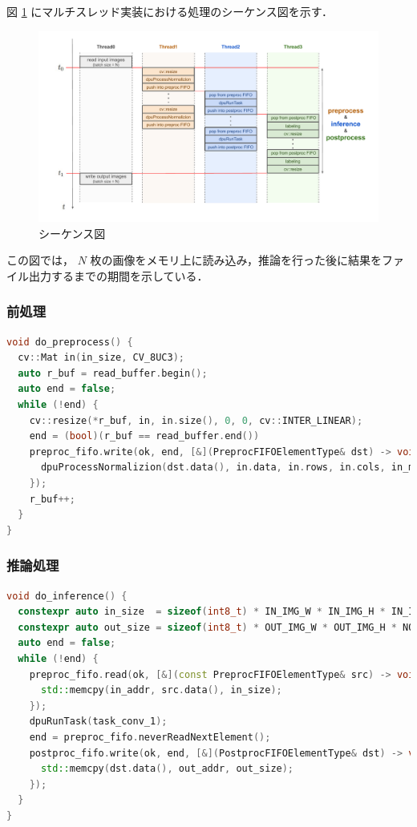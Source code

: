 図 \ref{fig:sequence} にマルチスレッド実装における処理のシーケンス図を示す．

\begin{figure}[h]
  \begin{center}
    \includegraphics[width=\linewidth]{figures/sw_opt_sequence.pdf}
    \caption{シーケンス図}
    \label{fig:sequence}
  \end{center}
\end{figure}

この図では， $N$ 枚の画像をメモリ上に読み込み，推論を行った後に結果をファイル出力するまでの期間を示している．

\subsubsection{前処理}

\setcounter{lstnumber}{1}
\begin{lstlisting}[language=c++,firstnumber=last,caption=do\_preprocess(),label=code:preproc,float,floatplacement=H]
void do_preprocess() {
  cv::Mat in(in_size, CV_8UC3);
  auto r_buf = read_buffer.begin();
  auto end = false;
  while (!end) {
    cv::resize(*r_buf, in, in.size(), 0, 0, cv::INTER_LINEAR);
    end = (bool)(r_buf == read_buffer.end())
    preproc_fifo.write(ok, end, [&](PreprocFIFOElementType& dst) -> void {
      dpuProcessNormalizion(dst.data(), in.data, in.rows, in.cols, in_mean, in_scale_fix, in.step1());
    });
    r_buf++;
  }
}
\end{lstlisting}

\subsubsection{推論処理}

\setcounter{lstnumber}{1}
\begin{lstlisting}[language=c++,firstnumber=last,caption=do\_inference(),label=code:inference,float,floatplacement=H]
void do_inference() {
  constexpr auto in_size  = sizeof(int8_t) * IN_IMG_W * IN_IMG_H * IN_IMG_C;
  constexpr auto out_size = sizeof(int8_t) * OUT_IMG_W * OUT_IMG_H * NOF_CLASS;
  auto end = false;
  while (!end) {
    preproc_fifo.read(ok, [&](const PreprocFIFOElementType& src) -> void {
      std::memcpy(in_addr, src.data(), in_size);
    });
    dpuRunTask(task_conv_1);
    end = preproc_fifo.neverReadNextElement();
    postproc_fifo.write(ok, end, [&](PostprocFIFOElementType& dst) -> void {
      std::memcpy(dst.data(), out_addr, out_size);
    });
  }
}
\end{lstlisting}


